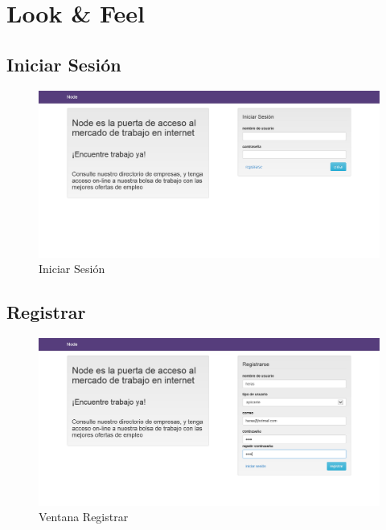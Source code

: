 \section{Look \& Feel}

\subsection{Iniciar Sesi\'on}
\begin{figure}[h]
\begin{center}
	\includegraphics[scale=0.40]{./resources/vistas/login.png}
	\caption{Iniciar Sesión}
	\label{fig:inicio}
\end{center}
\end{figure}


\newpage
\subsection{Registrar}
\begin{figure}[h]
\begin{center}
	\includegraphics[scale=0.40]{./resources/vistas/registro.png}
	\caption{Ventana Registrar}
	\label{fig:Registrar}
\end{center}
\end{figure}


